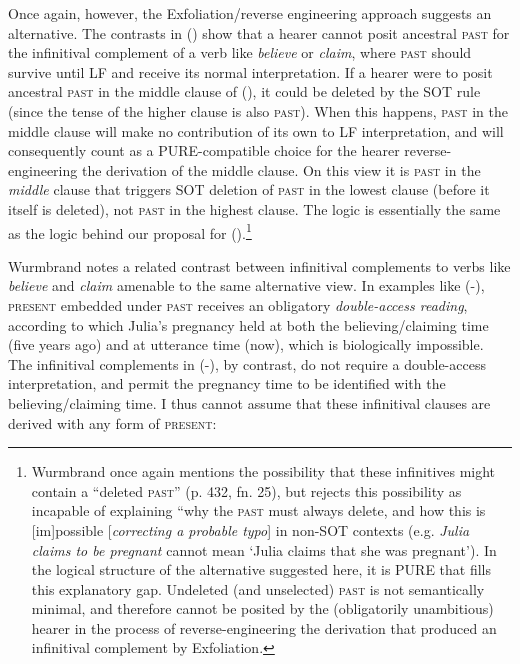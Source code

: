 \documentclass[output=paper]{langscibook}
\begin{document}
Once again, however, the Exfoliation/reverse engineering approach suggests an alternative. The contrasts in () show that a hearer cannot posit ancestral \textsc{past }for the infinitival complement of a verb like \textit{believe} or \textit{claim}, where \textsc{past }should survive until LF and receive its normal interpretation. If a hearer were to posit ancestral \textsc{past }in the middle clause of (), it could be deleted by the SOT rule (since the tense of the higher clause is also \textsc{past}). When this happens, \textsc{past }in the middle clause will make no contribution of its own to LF interpretation, and will consequently count as a PURE-compatible choice for the hearer reverse-engineering the derivation of the middle clause. On this view it is \textsc{past }in the\textit{ middle} clause that triggers SOT deletion of \textsc{past }in the lowest clause (before it itself is deleted), not \textsc{past }in the highest clause. The logic is essentially the same as the logic behind our proposal for ().\footnote{Wurmbrand once again mentions the possibility that these infinitives might contain a “deleted \textsc{past}” (p. 432, fn. 25), but rejects this possibility as incapable of explaining “why the \textsc{past }must always delete, and how this is {[}im{]}possible {[}\textit{correcting a probable typo}{]} in non-SOT contexts (e.g. \textit{Julia claims to be pregnant} cannot mean `Julia claims that she was pregnant'). In the logical structure of the alternative suggested here, it is PURE that fills this explanatory gap. Undeleted (and unselected) \textsc{past }is not semantically minimal, and therefore cannot be posited by the (obligatorily unambitious) hearer in the process of reverse-engineering the derivation that produced an infinitival complement by Exfoliation.} 

Wurmbrand notes a related contrast between infinitival complements to verbs like \textit{believe} and \textit{claim} amenable to the same alternative view. In examples like (-), \textsc{present} embedded under \textsc{past} receives an obligatory \textit{double-access reading}, according to which Julia's pregnancy held at both the believing/claiming time (five years ago) and at utterance time (now), which is biologically impossible. The infinitival complements in (-), by contrast, do not require a double-access interpretation, and permit the pregnancy time to be identified with the believing/claiming time. I thus cannot assume that these infinitival clauses are derived with any form of \textsc{present:}
\end{document}
